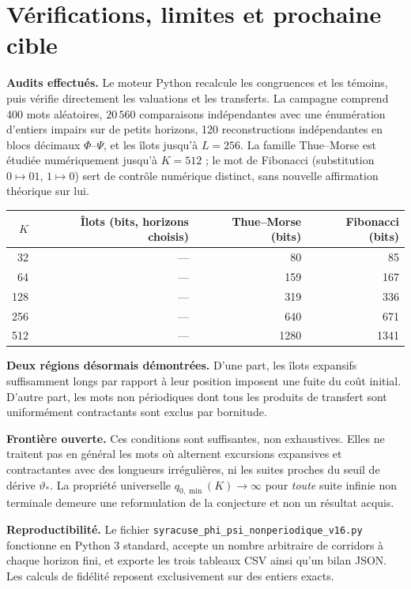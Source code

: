 \documentclass[11pt,a4paper]{article}
\begin{document}
\section{Vérifications, limites et prochaine cible}
\textbf{Audits effectués.} Le moteur Python recalcule les congruences et les témoins, puis vérifie directement les valuations et les transferts. La campagne comprend 400 mots aléatoires, $20\,560$ comparaisons indépendantes avec une énumération d'entiers impairs sur de petits horizons, 120 reconstructions indépendantes en blocs décimaux $\Phi$--$\Psi$, et les îlots jusqu'à $L=256$. La famille Thue--Morse est étudiée numériquement jusqu'à $K=512$ ; le mot de Fibonacci (substitution $0\mapsto01$, $1\mapsto0$) sert de contrôle numérique distinct, sans nouvelle affirmation théorique sur lui.
\begin{center}
\begin{tabular}{rrrr}
\toprule
$K$ & Îlots (bits, horizons choisis) & Thue--Morse (bits) & Fibonacci (bits)\\\midrule
32 & --- &80&85\\
64 & --- &159&167\\
128 & --- &319&336\\
256 & --- &640&671\\
512 & --- &1280&1341\\\bottomrule
\end{tabular}
\end{center}
\textbf{Deux régions désormais démontrées.} D'une part, les îlots expansifs suffisamment longs par rapport à leur position imposent une fuite du coût initial. D'autre part, les mots non périodiques dont tous les produits de transfert sont uniformément contractants sont exclus par bornitude.

\textbf{Frontière ouverte.} Ces conditions sont suffisantes, non exhaustives. Elles ne traitent pas en général les mots où alternent excursions expansives et contractantes avec des longueurs irrégulières, ni les suites proches du seuil de dérive $\vartheta_*$. La propriété universelle $q_{0,\min}(K)\to\infty$ pour \emph{toute} suite infinie non terminale demeure une reformulation de la conjecture et non un résultat acquis.

\textbf{Reproductibilité.} Le fichier \texttt{syracuse\_phi\_psi\_nonperiodique\_v16.py} fonctionne en Python 3 standard, accepte un nombre arbitraire de corridors à chaque horizon fini, et exporte les trois tableaux CSV ainsi qu'un bilan JSON. Les calculs de fidélité reposent exclusivement sur des entiers exacts.
\end{document}
